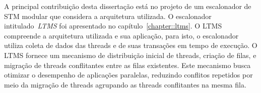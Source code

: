 \documentclass[diss,capa]{texufpel}
\begin{document}
A principal contribuição desta dissertação está no projeto de um escalonador de STM modular que considera a arquitetura utilizada. O escalonador intitulado~\emph{LTMS} foi apresentado no capítulo~\ref{chapter::ltms}. O LTMS compreende a arquitetura utilizada e sua aplicação, para isto, o escalonador utiliza coleta de dados das threads e de suas transações em tempo de execução. O LTMS fornece um mecanismo de distribuição inicial de threads, criação de filas, e migração de threads conflitantes entre as filas existentes. Este mecanismo busca otimizar o desempenho de aplicações paralelas, reduzindo conflitos repetidos por meio da migração de threads agrupando as threads conflitantes na mesma fila.

\end{document}
